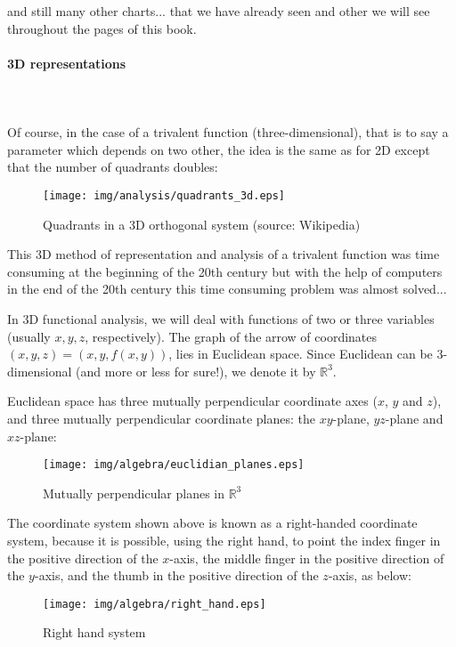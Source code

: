 and still many other charts... that we have already seen and other we will see throughout the pages of this book.

\paragraph{3D representations}\mbox{}\\\\
Of course, in the case of a trivalent function (three-dimensional), that is to say a parameter which depends on two other, the idea is the same as for 2D except that the number of quadrants doubles:

\begin{figure}[H]
\centering
\texttt{[image: img/analysis/quadrants\_3d.eps]}
\caption{Quadrants in a 3D orthogonal system (source: Wikipedia)}
\end{figure}

This 3D method of representation and analysis of a trivalent function was time consuming at the beginning of the 20th century but with the help of computers in the end of the 20th century this time consuming problem was almost solved...

In 3D functional analysis, we will deal with functions of two or three variables (usually  $x, y, z$, respectively). The graph of the arrow of coordinates $(x, y, z)=(x,y,f(x,y))$, lies in Euclidean space. Since Euclidean can be 3-dimensional (and more or less for sure!), we denote it by $\mathbb{R}^3$.

Euclidean space has three mutually perpendicular coordinate axes ($x$, $y$ and $z$), and three
mutually perpendicular coordinate planes: the $xy$-plane, $yz$-plane and $xz$-plane:

\begin{figure}[H]
\centering
\texttt{[image: img/algebra/euclidian\_planes.eps]}
\caption{Mutually perpendicular planes in $\mathbb{R}^3$}
\end{figure}

The coordinate system shown above is known as a right-handed coordinate system, because it is possible, using the right hand, to point the index finger in the positive direction of the $x$-axis, the middle finger in the positive direction of the $y$-axis, and the thumb in the positive direction of the $z$-axis, as below:

\begin{figure}[H]
\centering
\texttt{[image: img/algebra/right\_hand.eps]}
\caption{Right hand system}
\end{figure}

